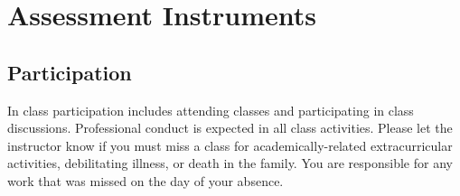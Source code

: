 \documentclass[12pt]{article}
\begin{document}
\section*{Assessment Instruments}
\subsection*{Participation}
In class participation includes attending classes and participating in class discussions. Professional conduct is expected in all class activities. Please let the instructor know if you must miss a class for academically-related extracurricular activities, debilitating illness, or death in the family. You are responsible for any work that was missed on the day of your absence.
\end{document}
